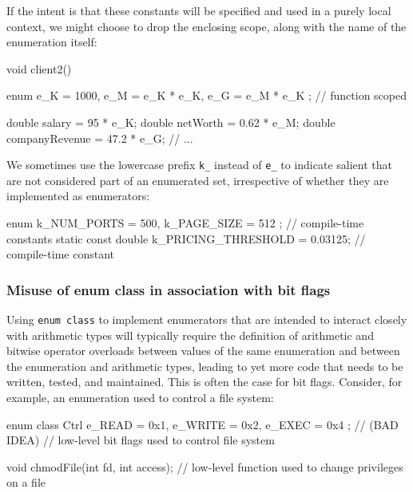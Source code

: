\noindent If the intent is that these constants will be specified and used in a
purely local context, we might choose to drop the enclosing scope, along
with the name of the enumeration itself:

\begin{emcppslisting}
void client2()
{
    enum { e_K = 1000, e_M = e_K * e_K, e_G = e_M * e_K };  // function scoped

    double salary = 95 * e_K;
    double netWorth = 0.62 * e_M;
    double companyRevenue = 47.2 * e_G;
    // ...
}
\end{emcppslisting}

\noindent We sometimes use the
lowercase prefix \lstinline!k_! instead of \lstinline!e_! to indicate
salient  that are not considered part
of an enumerated set, irrespective of whether they are implemented as
enumerators:

\begin{emcppslisting}[language=C++]
enum { k_NUM_PORTS = 500, k_PAGE_SIZE = 512 };     // compile-time constants
static const double k_PRICING_THRESHOLD = 0.03125; // compile-time constant
\end{emcppslisting}

\subsubsection[Misuse of \lstinline!enum! \lstinline!class! in association with bit flags]{Misuse of {\SubsubsecCode enum} {\SubsubsecCode class} in association with bit flags}\label{misuse-of-enum-class-in-association-with-bit-flags}

Using \lstinline!enum!~\lstinline!class! to implement enumerators that are
intended to interact closely with arithmetic types will typically
require the definition of arithmetic and bitwise operator overloads
between values of the same enumeration and between the enumeration and
arithmetic types, leading to yet more code that needs to be written,
tested, and maintained. This is often the case for bit flags. Consider, for example, an
enumeration used to control a file system:

\begin{emcppslisting}[emcppsbatch=e14]
enum class Ctrl { e_READ = 0x1, e_WRITE = 0x2, e_EXEC = 0x4 };  // (BAD IDEA)
    // low-level bit flags used to control file system

void chmodFile(int fd, int access);
    // low-level function used to change privileges on a file
\end{emcppslisting}

